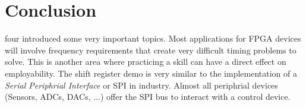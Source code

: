 \section{\bfseries  Conclusion}
   four introduced some very important topics. Most applications for FPGA devices will involve frequency requirements that create very difficult timing problems to solve. This is another area where practicing a skill can have a direct effect on employability. The shift register demo is very similar to the implementation of a {\it Serial Periphrial Interface} or SPI in industry. Almost all periphrial devices (Sensors, ADCs, DACs, ...) offer the SPI bus to interact with a control device.



